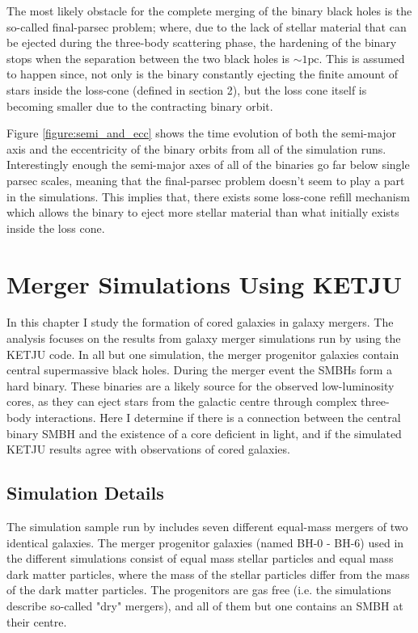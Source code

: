 \documentclass[english, oneside]{HYgradu}
\begin{document}
The most likely obstacle for the complete merging of the binary black holes is the so-called final-parsec problem; where, due to the lack of stellar material that can be ejected during the three-body scattering phase, the hardening of the binary stops when the separation between the two black holes is $\sim 1 \mathrm{pc}$. This is assumed to happen since, not only is the binary constantly ejecting the finite amount of stars inside the loss-cone (defined in section 2), but the loss cone itself is becoming smaller due to the contracting binary orbit.

Figure \ref{figure:semi_and_ecc} shows the time evolution of both the semi-major axis and the eccentricity of the binary orbits from all of the simulation runs. Interestingly enough the semi-major axes of all of the binaries go far below single parsec scales, meaning that the final-parsec problem doesn't seem to play a part in the simulations. This implies that, there exists some loss-cone refill mechanism which allows the binary to eject more stellar material than what initially exists inside the loss cone.



\chapter{Merger Simulations Using KETJU}

In this chapter I study the formation of cored galaxies in galaxy mergers. The analysis focuses on the results from galaxy merger simulations run by \cite{Rantala2018} using the KETJU code. In all but one simulation, the merger progenitor galaxies contain central supermassive black holes. During the merger event the SMBHs form a hard binary. These binaries are a likely source for the observed low-luminosity cores, as they can eject stars from the galactic centre through complex three-body interactions. Here I determine if there is a connection between the central binary SMBH and the existence of a core deficient in light, and if the simulated KETJU results agree with observations of cored galaxies.


\section{Simulation Details}

The simulation sample run by \cite{Rantala2018} includes seven different equal-mass mergers of two identical galaxies. The merger progenitor galaxies (named BH-0 - BH-6) used in the different simulations consist of equal mass stellar particles and equal mass dark matter particles, where the mass of the stellar particles differ from the mass of the dark matter particles. The progenitors are gas free (i.e. the simulations describe so-called "dry" mergers), and all of them but one contains an SMBH at their centre.
\end{document}
